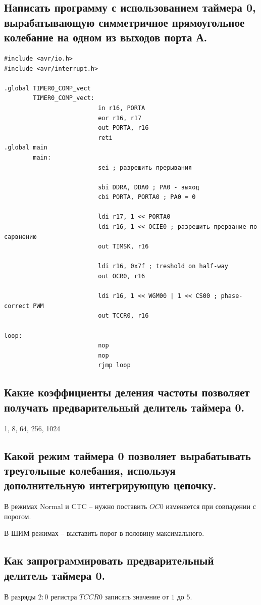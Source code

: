 \subsection{Написать программу с использованием таймера 0, вырабатывающую симметричное прямоугольное колебание на одном из выходов порта А.}
\begin{verbatim}
#include <avr/io.h>
#include <avr/interrupt.h>

.global TIMER0_COMP_vect
        TIMER0_COMP_vect:
                          in r16, PORTA
                          eor r16, r17
                          out PORTA, r16
                          reti
.global main
        main:
                          sei ; разрешить прерывания

                          sbi DDRA, DDA0 ; PA0 - выход
                          cbi PORTA, PORTA0 ; PA0 = 0

                          ldi r17, 1 << PORTA0
                          ldi r16, 1 << OCIE0 ; разрешить прервание по сарвнению
                          out TIMSK, r16

                          ldi r16, 0x7f ; treshold on half-way
                          out OCR0, r16

                          ldi r16, 1 << WGM00 | 1 << CS00 ; phase-correct PWM
                          out TCCR0, r16

loop:
                          nop
                          nop
                          rjmp loop
\end{verbatim}

\subsection{Какие коэффициенты деления частоты позволяет получать предварительный делитель таймера 0.}
1, 8, 64, 256, 1024

\subsection{Какой режим таймера 0 позволяет вырабатывать треугольные колебания, используя дополнительную интегрирующую цепочку.}
В режимах Normal и CTC --  нужно поставить $OC0$ изменяется при совпадении с порогом.

В ШИМ режимах -- выставить порог в половину максимального.

\subsection{Как запрограммировать предварительный делитель таймера 0.}
В разряды $2:0$ регистра $TCCR0$ записать значение от $1$ до $5$.

